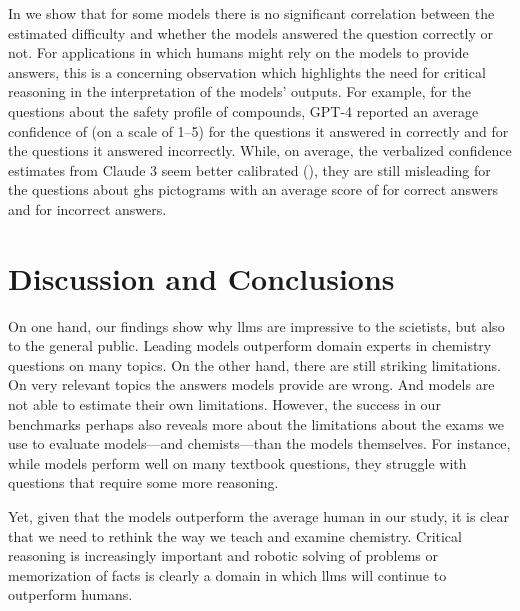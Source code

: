 \documentclass[11pt, oneside]{article}
\begin{document}
\begin{refsection}
In  we show that for some models there is no significant correlation between the estimated difficulty and whether the models answered the question correctly or not.
For applications in which humans might rely on the models to provide answers, this is a concerning observation which highlights the need for critical reasoning in the interpretation of the models' outputs.\autocite{Li_2023}
For example, for the questions about the safety profile of compounds, GPT-4 reported an average confidence of  (on a scale of 1--5) for the  questions it answered in correctly and  for the  questions it answered incorrectly.
While, on average, the verbalized confidence estimates from Claude 3 seem better calibrated (), they are still misleading for the questions about \gls{ghs} pictograms with an average score of  for correct answers and  for incorrect answers.

\section{Discussion and Conclusions}
On one hand, our findings show why \glspl{llm} are impressive to the scietists, but also to the general public. Leading models outperform domain experts in chemistry questions on many topics. 
On the other hand, there are still striking limitations. On very relevant topics the answers models provide are wrong. And models are not able to estimate their own limitations.
However, the success in our benchmarks perhaps also reveals more about the limitations about the exams we use to evaluate models---and chemists---than the models themselves.
For instance, while models perform well on many textbook questions, they struggle with questions that require some more reasoning.

Yet, given that the models outperform the average human in our study, it is clear that we need to rethink the way we teach and examine chemistry.
Critical reasoning is increasingly important and robotic solving of problems or memorization of facts is clearly a domain in which \glspl{llm} will continue to outperform humans.


\end{refsection}
\end{document}
